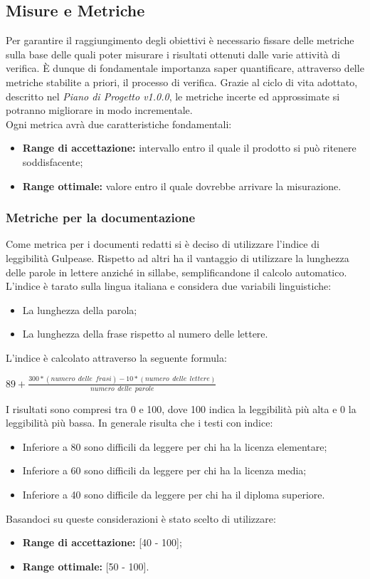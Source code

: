 \subsection{Misure e Metriche}
Per garantire il raggiungimento degli obiettivi è necessario fissare delle metriche sulla base delle quali poter misurare i risultati ottenuti dalle varie attività di verifica. È dunque di fondamentale importanza saper quantificare, attraverso delle metriche stabilite a priori, il processo di verifica. Grazie al ciclo di vita adottato, descritto nel \textit{Piano di Progetto v1.0.0}, le metriche incerte ed approssimate si potranno migliorare in modo incrementale.\\
Ogni metrica avrà due caratteristiche fondamentali:
\begin{itemize}
	\item \textbf{Range di accettazione:} intervallo entro il quale il prodotto si può ritenere soddisfacente;
	\item \textbf{Range ottimale:} valore entro il quale dovrebbe arrivare la misurazione.
\end{itemize} 
	\subsubsection{Metriche per la documentazione}
	Come metrica per i documenti redatti si è deciso di utilizzare l'indice di leggibilità Gulpease. Rispetto ad altri ha il vantaggio di utilizzare la lunghezza delle parole in lettere anziché in sillabe, semplificandone il calcolo automatico. L'indice è tarato sulla lingua italiana e considera due variabili linguistiche:
	\begin{itemize}
		\item La lunghezza della parola;
		\item La lunghezza della frase rispetto al numero delle lettere.
	\end{itemize} 
	L'indice è calcolato attraverso la seguente formula:\\
	\begin{center}
	$89+ \frac{300*\left(numero\:\ delle\:\ frasi \right)-10*\left(numero\:\ delle\:\ lettere\right)}{numero\:\ delle\:\ parole}$
	\end{center}
	I risultati sono compresi tra 0 e 100, dove 100 indica la leggibilità più alta e 0 la leggibilità più bassa. In generale risulta che i testi con indice:
	\begin{itemize}
		\item Inferiore a 80 sono difficili da leggere per chi ha la licenza elementare;
		\item Inferiore a 60 sono difficili da leggere per chi ha la licenza media;
		\item Inferiore a 40 sono difficile da leggere per chi ha il diploma superiore.
	\end{itemize}
	Basandoci su queste considerazioni è stato scelto di utilizzare:
	\begin{itemize}
		\item \textbf{Range di accettazione:} [40 - 100];
		\item \textbf{Range ottimale:} [50 - 100].
	\end{itemize}
	
